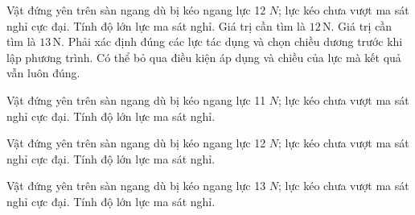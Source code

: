 \begin{ex}
Vật đứng yên trên sàn ngang dù bị kéo ngang lực 12 $N$; lực kéo chưa vượt ma sát nghỉ cực đại. Tính độ lớn lực ma sát nghỉ.
\choiceTF
{\True Giá trị cần tìm là $12\,\text{N}$.}
{Giá trị cần tìm là $13\,\text{N}$.}
{\True Phải xác định đúng các lực tác dụng và chọn chiều dương trước khi lập phương trình.}
{Có thể bỏ qua điều kiện áp dụng và chiều của lực mà kết quả vẫn luôn đúng.}
\end{ex}

\begin{ex}
Vật đứng yên trên sàn ngang dù bị kéo ngang lực 11 $N$; lực kéo chưa vượt ma sát nghỉ cực đại. Tính độ lớn lực ma sát nghỉ.
\end{ex}

\begin{ex}
Vật đứng yên trên sàn ngang dù bị kéo ngang lực 12 $N$; lực kéo chưa vượt ma sát nghỉ cực đại. Tính độ lớn lực ma sát nghỉ.
\end{ex}

\begin{ex}
Vật đứng yên trên sàn ngang dù bị kéo ngang lực 13 $N$; lực kéo chưa vượt ma sát nghỉ cực đại. Tính độ lớn lực ma sát nghỉ.
\end{ex}


